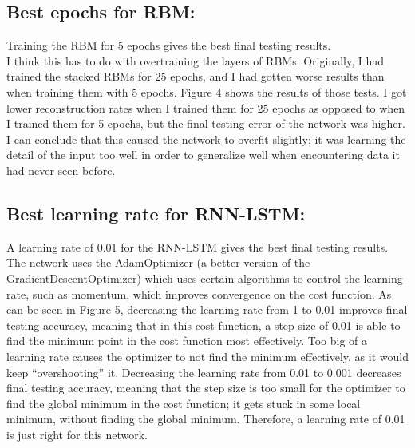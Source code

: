 \documentclass[a4paper]{article}
\begin{document}
\subsection{Best epochs for RBM:}
\hspace*{10mm}
Training the RBM for 5 epochs gives the best final testing results.
\\\hspace*{10mm}
I think this has to do with overtraining the layers of RBMs. Originally, I had trained the stacked RBMs for 25 epochs, and I had gotten worse results than when training them with 5 epochs. Figure 4 shows the results of those tests. I got lower reconstruction rates when I trained them for 25 epochs as opposed to when I trained them for 5 epochs, but the final testing error of the network was higher. I can conclude that this caused the network to overfit slightly; it was learning the detail of the input too well in order to generalize well when encountering data it had never seen before.

\subsection{Best learning rate for RNN-LSTM:}
\hspace*{10mm}
A learning rate of 0.01 for the RNN-LSTM gives the best final testing results. 
\\\hspace*{10mm}
The network uses the AdamOptimizer (a better version of the GradientDescentOptimizer) which uses certain algorithms to control the learning rate, such as momentum, which improves convergence on the cost function. As can be seen in Figure 5, decreasing the learning rate from 1 to 0.01 improves final testing accuracy, meaning that in this cost function, a step size of 0.01 is able to find the minimum point in the cost function most effectively. Too big of a learning rate causes the optimizer to not find the minimum effectively, as it would keep “overshooting” it. Decreasing the learning rate from 0.01 to 0.001 decreases final testing accuracy, meaning that the step size is too small for the optimizer to find the global minimum in the cost function; it gets stuck in some local minimum, without finding the global minimum. Therefore, a learning rate of 0.01 is just right for this network.
\end{document}
